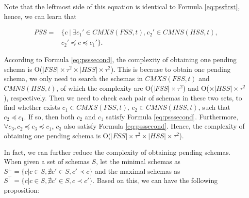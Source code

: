 \documentclass{sig-alternate-05-2015}
\begin{document}
{{Note that the leftmost side of this equation is identical to Formula \ref{eq:pssfirst}, hence, we can learn that



\begin{equation}\label{eq:psssecond}
\begin{aligned}
PSS = & \{ c\ |\ \exists c_{1}' \in CMXS(FSS, t), c_{2}' \in CMNS(HSS, t), \\
    & c_{2}' \preceq c \preceq c_{1}' \}.
\end{aligned}
\end{equation}

According to Formula \ref{eq:psssecond}, the complexity of obtaining one pending schema is O($|FSS|\times \tau^{2} \times |HSS|\times \tau^{2}$). This is because to obtain one pending schema, we only need to search the schemas in $CMXS(FSS, t)$ and $CMNS(HSS, t)$, of which the complexity are O($|FSS|\times \tau^{2}$) and O($\times |HSS|\times \tau^{2}$), respectively. Then we need to check each pair of schemas in these two sets, to find whether exists $c_{1} \in CMXS(FSS, t)$, $c_{2} \in CMNS(HSS, t)$, such that $c_{2} \preceq c_{1}$. If so, then both $c_{2}$ and $c_{1}$ satisfy Formula \ref{eq:psssecond}. Furthermore, $\forall c_{3}, c_{2} \preceq c_{3} \preceq c_{1}$, $c_{3}$ also satisfy Formula \ref{eq:psssecond}. Hence, the complexity of obtaining one pending schema is O($|FSS|\times \tau^{2} \times |HSS|\times \tau^{2}$).

In fact, we can further reduce the complexity of obtaining pending schemas. When given a set of schemas $S$, let the minimal schemas as $S^{\bot } = \{ c | c \in S, \nexists c' \in S, c' \prec c \}$ and the maximal schemas as $S^{\top } = \{ c | c \in S, \nexists c' \in S, c \prec c' \}$. Based on this, we can have the following proposition:

}}
\end{document}
